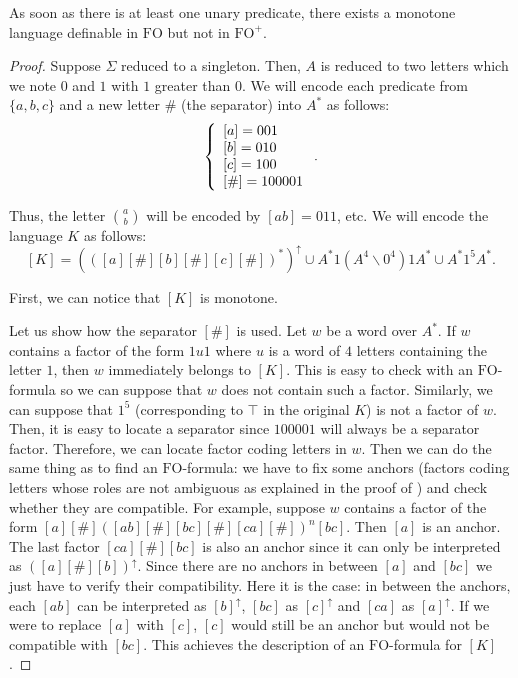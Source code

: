 \documentclass[a4paper,UKenglish,cleveref, autoref, thm-restate]{lipics-v2021}
\newcommand{\FO}{\mathrm{FO}}
\newcommand{\FOp}{\FO^+}
\begin{document}
\begin{proposition} \label{prop:onepred}
    As soon as there is at least one unary predicate, there exists a monotone language definable in $\FO$ but not in $\FOp$.
\end{proposition}




\begin{proof}
    

Suppose $\Sigma$ reduced to a singleton.
Then, $A$ is reduced to two letters which we note $0$ and $1$ with $1$ greater than $0$.
We will encode each predicate from $\{a,b,c\}$ and a new letter $\#$ (the separator) into $A^*$ as follows:
$$
\left\{
\begin{array}{l}
    [a] = 001 \\ \relax
    [b] = 010 \\ \relax
    [c] = 100 \\ \relax
    [\#] = 100001
\end{array}
\right. .
$$

Thus, the letter $\binom ab$ will be encoded by $[ab]=011$, etc.
We will encode the language $K$ as follows:
$$
[K] = (([a][\#][b][\#][c][\#])^*)^{\uparrow} \cup A^* 1 (A^4 \backslash 0^4) 1 A^* \cup A^*1^5A^*.
$$


First, we can notice that $[K]$ is monotone.

Let us show how the separator $[\#]$ is used.
Let $w$ be a word over $A^*$.
If $w$ contains a factor of the form $1u1$ where $u$ is a word of $4$ letters containing the letter $1$, then $w$ immediately belongs to $[K]$.
This is easy to check with an $\FO$-formula so we can suppose that $w$ does not contain such a factor.
Similarly, we can suppose that $1^5$ (corresponding to $\top$ in the original $K$) is not a factor of $w$.
Then, it is easy to locate a separator since $100001$ will always be a separator factor.
Therefore, we can locate factor coding letters in $w$.
Then we can do the same thing as \cite{PFO} to find an $\FO$-formula: we have to fix some anchors (factors coding letters whose roles are not ambiguous as explained in the proof of ) and check whether they are compatible.
For example, suppose $w$ contains a factor of the form $[a][\#]([ab][\#][bc][\#][ca][\#])^n[bc]$.
Then $[a]$ is an anchor.
The last factor $[ca][\#][bc]$ is also an anchor since it can only be interpreted as $([a][\#][b])^\uparrow$.
Since there are no anchors in between $[a]$ and $[bc]$ we just have to verify their compatibility.
Here it is the case:
in between the anchors, each $[ab]$ can be interpreted as $[b]^\uparrow$, $[bc]$ as $[c]^\uparrow$ and $[ca]$ as $[a]^\uparrow$.
If we were to replace $[a]$ with $[c]$, $[c]$ would still be an anchor but would not be compatible with $[bc]$.
This achieves the description of an $\FO$-formula for $[K]$.






\end{proof}
\end{document}
